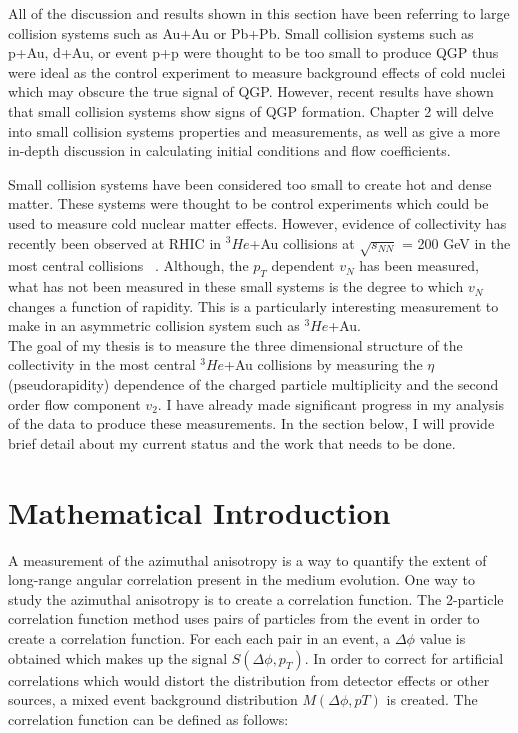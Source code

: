 All of the discussion and results shown in this section have been referring to large collision systems such as Au+Au or Pb+Pb. Small collision systems such as p+Au, d+Au, or event p+p were thought to be too small to produce QGP thus were ideal as the control experiment to measure background effects of cold nuclei which may obscure the true signal of QGP. However, recent results have shown that small collision systems show signs of QGP formation. Chapter 2 will delve into small collision systems properties and measurements, as well as give a more in-depth discussion in calculating initial conditions and flow coefficients.

\iffalse

Small collision systems have been considered too small to create hot and dense matter. These systems were thought to be control experiments which could be used to measure cold nuclear matter effects. However, evidence of collectivity has recently been observed at RHIC in $^3He$+Au collisions at $\sqrt{s_{NN}}$ = 200 GeV in the most central collisions ~\cite{PhysRevLett.115.142301}. Although, the $p_T$ dependent $v_N$ has been measured, what has not been measured in these small systems is the degree to which $v_N$ changes a function of rapidity. This is a particularly interesting measurement to make in an asymmetric collision system such as $^3He$+Au.\\

The goal of my thesis is to measure the three dimensional structure of the collectivity in the most central $^3He$+Au collisions by measuring the $\eta$ (pseudorapidity) dependence of the charged particle multiplicity and the second order flow component $v_2$. I have already made significant progress in my analysis of the data to produce these measurements. In the section below, I will provide brief detail about my current status and the work that needs to be done.

\section{Mathematical Introduction}
A measurement of the azimuthal anisotropy is a way to quantify the extent of long-range angular correlation present in the medium evolution. One way to study the azimuthal anisotropy is to create a correlation function. The 2-particle correlation function method uses pairs of particles from the event in order to create a correlation function. For each each pair in an event, a $\Delta\phi$ value is obtained which makes up the signal $S(\Delta\phi,p_T)$. In order to correct for artificial correlations which would distort the distribution from detector effects or other sources, a mixed event background distribution $M(\Delta\phi,pT)$ is created. The correlation function can be defined as follows:

